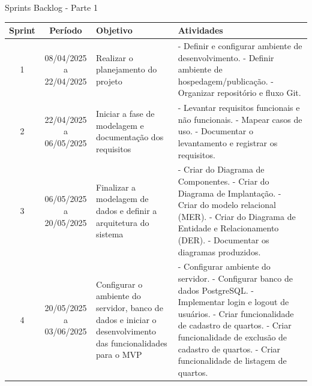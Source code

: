 \documentclass[
	12pt,				%
	openany,			%
	twoside,			%
	a4paper,			%
	english,			%
	french,				%
	spanish,			%
	brazil				%
	]{abntex2}
\begin{document}
\begin{quadro}[H]
	\caption{Sprints Backlog - Parte 1} 
	\label{sprints_backlog_1} 
	\begin{tabular}{|c|c|p{4cm}|p{6cm}|}
	\hline
	\textbf{Sprint} & \textbf{Período} & \textbf{Objetivo} & \textbf{Atividades} \\
		\hline
		1 & 08/04/2025 a 22/04/2025 & Realizar o planejamento do projeto  &
		- Definir e configurar ambiente de desenvolvimento. \newline
		- Definir ambiente de hospedagem/publicação. \newline
		- Organizar repositório e fluxo Git. \\
		\hline
		2 & 22/04/2025 a 06/05/2025 & Iniciar a fase de modelagem e documentação dos requisitos &
		- Levantar requisitos funcionais e não funcionais. \newline
		- Mapear casos de uso. \newline
		- Documentar o levantamento e registrar os requisitos. \\
		\hline
		3 & 06/05/2025 a 20/05/2025 & Finalizar a modelagem de dados e definir a arquitetura do sistema &
		- Criar do Diagrama de Componentes. \newline
		- Criar do Diagrama de Implantação. \newline
		- Criar do modelo relacional (MER). \newline
		- Criar do Diagrama de Entidade e Relacionamento (DER). \newline
		- Documentar os diagramas produzidos. \\
		\hline	
		4 & 20/05/2025 a 03/06/2025 & Configurar o ambiente do servidor, banco de dados e iniciar o desenvolvimento das funcionalidades para o MVP &
		- Configurar ambiente do servidor. \newline
		- Configurar banco de dados PostgreSQL. \newline
		- Implementar login e logout de usuários. \newline
		- Criar funcionalidade de cadastro de quartos. \newline
		- Criar funcionalidade de exclusão de cadastro de quartos. \newline
		- Criar funcionalidade de listagem de quartos. \\
		\hline
		\end{tabular}
			\end{quadro}
			
\end{document}
